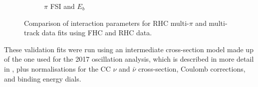 \begin{figure}[t]
\begin{subfigure}{0.49\textwidth}
  \caption{$\pi$ FSI and $E_b$}
\end{subfigure}
\caption{Comparison of interaction parameters for RHC multi-$\pi$ and multi-track data fits using FHC and RHC data.}
\label{fig:rhcmpidat28xsec}
\end{figure}

These validation fits were run using an intermediate cross-section model made up of the one used for the 2017 oscillation analysis, which is described in more detail in \cite{tn315}, plus normalisations for the CC $\nu$ and $\bar{\nu}$ cross-section, Coulomb corrections, and binding energy dials. 

\newpage
